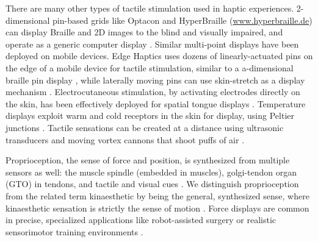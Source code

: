 There are many other types of tactile stimulation used in haptic experiences.
2-dimensional pin-based grids like Optacon \cite{Bliss1970} and HyperBraille (\url{www.hyperbraille.de}) can display Braille and 2D images to the blind and visually impaired, and operate as a generic computer display \cite{Prescher2010}. 
Similar multi-point displays have been deployed on mobile devices.
Edge Haptics uses dozens of linearly-actuated pins on the edge of a mobile device for tactile stimulation, similar to a a-dimensional braille pin display \cite{Jang2016}, while laterally moving pins can use skin-stretch as a display mechanism \cite{Luk2006}.
Electrocutaneous stimulation, by activating electrodes directly on the skin, has been effectively deployed for spatial tongue displays \cite{Bach-y-Rita1998}.
Temperature displays exploit warm and cold receptors in the skin for display, using Peltier junctions \cite{Jones2002}.
Tactile sensations can be created at a distance using ultrasonic transducers \cite{Obrist2013,Carter2013} and moving vortex cannons that shoot puffs of air \cite{Sodhi2013}.




Proprioception, the sense of force and position, is synthesized from multiple sensors as well: the muscle spindle (embedded in muscles), golgi-tendon organ (GTO) in tendons, and tactile and visual cues \cite{Kandel2000}.
We distinguish proprioception from the related term kinaesthetic by being the general, synthesized sense, where kinaesthetic sensation is strictly the sense of motion .
Force displays are common in precise, specialized applications like robot-assisted surgery \cite{Okamura2009} or realistic sensorimotor training environments \cite{VanDerMeijden2009}.

